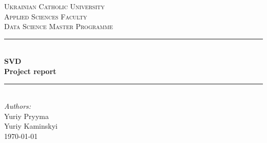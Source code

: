 \begin{titlepage}

\newcommand{\HRule}{\rule{\linewidth}{0.5mm}} %

\center %
 

\textsc{\LARGE Ukrainian Catholic University}\\[1cm] %
\textsc{\Large Applied Sciences Faculty}\\[0.5cm] %
\textsc{\large Data Science Master Programme}\\[0.5cm] %


\HRule \\[0.4cm]
{ \huge \bfseries SVD}\\[10pt]
{\Large \bfseries Project report}\\[0.4cm] %
\HRule \\[1cm]
 


\Large \emph{Authors:}\\
Yuriy Pryyma \\
Yuriy Kaminskyi\\[1cm] %


{\large \today}\\[2cm] %



\end{titlepage}
